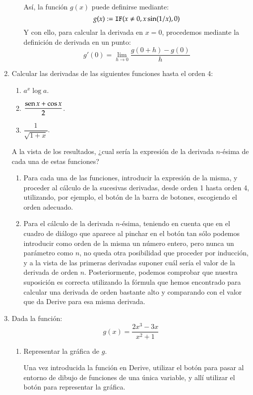 \begin{enumerate}[leftmargin=*]
\begin{indicacion}
\begin{enumerate}
Así, la función $g(x)$ puede definirse mediante:
\[
g(x):=\texttt{IF}(x\neq0,x\sin(1/x),0)
\]
Y con ello, para calcular la derivada en $x=0$, procedemos mediante la definición de derivada en un punto:
\[
g'(0) = \mathop {\lim }\limits_{h \to 0} \frac{{g(0 + h) - g(0)}}
{h}
\]
\end{enumerate}
\end{indicacion}


\item  Calcular las derivadas de las siguientes funciones hasta el orden 4:
\begin{enumerate}
\item  $a^x\log a$.
\item  $\dfrac{\operatorname{sen} x +\cos x}{2}$.
\item  $\dfrac{1}{\sqrt{1+x}}$.
\end{enumerate}

A la vista de los resultados, ¿cual sería la expresión de la derivada $n$-ésima de cada una de estas funciones?
\begin{indicacion}
\begin{enumerate}
\item Para cada una de las funciones, introducir la expresión de la misma, y proceder al cálculo de la sucesivas derivadas, desde orden 1
hasta orden 4, utilizando, por ejemplo, el botón  de la barra de botones, escogiendo el orden adecuado.
\item Para el cálculo de la derivada $n$-ésima, teniendo en cuenta que en el cuadro de diálogo que aparece al pinchar en el botón
 tan sólo podemos introducir como orden de la misma un número entero, pero nunca un parámetro como $n$, no queda
otra posibilidad que proceder por inducción, y a la vista de las primeras derivadas suponer cuál sería el valor de la derivada de orden $n$.
Posteriormente, podemos comprobar que nuestra suposición es correcta utilizando la fórmula que hemos encontrado para calcular una derivada
de orden bastante alto y comparando con el valor que da Derive para esa misma derivada.
\end{enumerate}
\end{indicacion}


\item  Dada la función:
\[
g(x)=\dfrac{2x^{3}-3x}{x^{2}+1}
\]

\begin{enumerate}
\item  Representar la gráfica de $g$.
\begin{indicacion}
Una vez introducida la función en Derive, utilizar el botón  para pasar al entorno de dibujo de funciones de una única
variable, y allí utilizar el botón  para representar la gráfica. 
\end{indicacion}


\end{enumerate}
\end{enumerate}
